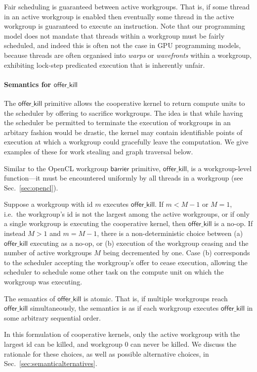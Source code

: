 \documentclass[numbers,nocopyrightspace,10pt]{sigplanconf}
\newcommand{\mysec}{Sec.~}
\newcommand{\offerkill}{\mathsf{offer\_kill}}
\begin{document}
Fair scheduling is guaranteed between active workgroups.  That is, if
some thread in an active workgroup is enabled then eventually some
thread in the active workgroup is guaranteed to execute an
instruction.  Note that our programming model does not mandate that
threads within a workgroup must be fairly scheduled, and indeed this
is often not the case in GPU programming models, because threads are
often organised into \emph{warps} or \emph{wavefronts} within a
workgroup, exhibiting lock-step predicated execution that is
inherently unfair.

\paragraph{Semantics for $\offerkill$}

The $\offerkill$ primitive allows the cooperative kernel to return
compute units to the scheduler by offering to sacrifice workgroups.
The idea is that while having the scheduler be permitted to terminate
the execution of workgroups in an arbitary fashion would be drastic,
the kernel may contain identifiable points of execution at which a
workgroup could gracefully leave the computation.  We give examples of
these for work stealing and graph traversal below.

Similar to the OpenCL workgroup $\mathsf{barrier}$ primitive,
$\offerkill$, is a workgroup-level function---it must be encountered
uniformly by all threads in a workgroup (see
\mysec\ref{sec:opencl}).

Suppose a workgroup with id $m$ executes $\offerkill$.  If $m < M-1$
or $M=1$, i.e.\ the workgroup's id is not the largest among the active
workgroups, or if only a single workgroup is executing the cooperative
kernel, then $\offerkill$ is a no-op.  If instead $M > 1$ and $m =
M-1$, there is a non-deterministic choice between (a) $\offerkill$
executing as a no-op, or (b) execution of the workgroup ceasing and
the number of active workgroups $M$ being decremented by one.  Case
(b) corresponds to the scheduler accepting the workgroup's offer to
cease execution, allowing the scheduler to schedule some other task on
the compute unit on which the workgroup was executing.

The semantics of $\offerkill$ is atomic.  That is, if multiple
workgroups reach $\offerkill$ simultaneously, the semantics is as if
each workgroup executes $\offerkill$ in some arbitrary sequential
order.

In this formulation of cooperative kernels, only the active workgroup
with the largest id can be killed, and workgroup 0 can never be
killed.  We discuss the rationale for these choices, as well as
possible alternative choices, in
\mysec\ref{sec:semanticalternatives}.
\end{document}
